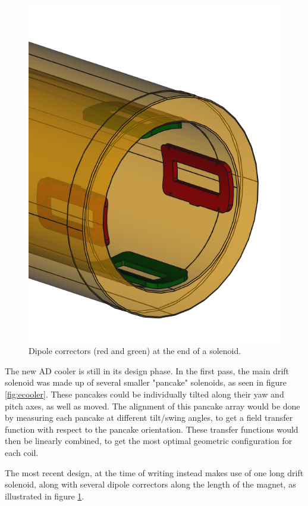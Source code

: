 \newpage
\begin{figure}
    \includegraphics[width=0.9\linewidth]{figs/dipolecorrectors}
    \caption{Dipole correctors (red and green) at the end of a
        solenoid.}
    \label{fig:dipolecorrectors}
\end{figure}

The new AD cooler is still in its design phase. In the first pass,
the main drift solenoid was made up of several smaller "pancake"
solenoids, as seen in figure \ref{fig:ecooler}. These pancakes could
be individually tilted along their yaw and pitch axes, as well as moved.
The alignment of this pancake array would be done by measuring each
pancake at different tilt/swing angles, to get a field transfer function
with respect to the pancake orientation. These transfer functions would
then be linearly combined, to get the most optimal geometric configuration
for each coil.

The most recent design, at the time of writing instead makes use of
one long drift solenoid, along with several dipole correctors along the
length of the magnet, as illustrated in figure \ref{fig:dipolecorrectors}.

